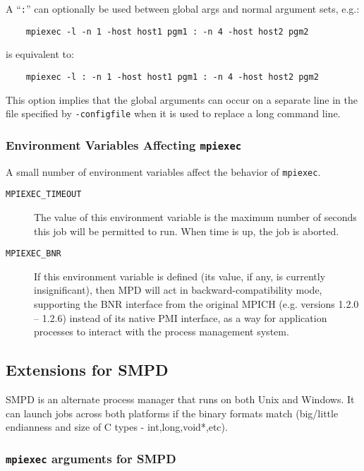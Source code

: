 \documentclass[dvipdfm,11pt]{article}
\begin{document}
A ``\texttt{:}'' can optionally be used between global args
and normal argument sets, e.g.:
\begin{verbatim}
    mpiexec -l -n 1 -host host1 pgm1 : -n 4 -host host2 pgm2
\end{verbatim}
is equivalent to:
\begin{verbatim}
    mpiexec -l : -n 1 -host host1 pgm1 : -n 4 -host host2 pgm2
\end{verbatim}
This option implies that the global arguments can occur on a separate
line in the file specified by \texttt{-configfile} when it is used to 
replace a long command line.

\subsubsection{Environment Variables Affecting \texttt{mpiexec}}
\label{sec:mpd-mpiexec-env}

A small number of environment variables affect the behavior of
\texttt{mpiexec}. 

\begin{description}
\item[\texttt{MPIEXEC\_TIMEOUT}] The value of this environment variable is the
  maximum number of seconds this job will be permitted to run.  When
  time is up, the job is aborted. 
\item[\texttt{MPIEXEC\_BNR}] If this environment variable is defined
  (its value, if any, is currently insignificant), then MPD will act in
  backward-compatibility mode, supporting the BNR interface from the
  original MPICH (e.g. versions 1.2.0 -- 1.2.6)
  instead of its native PMI interface, as a way for application
  processes to interact with the process management system.
\end{description}


\subsection{Extensions for SMPD}
\label{sec:extensions-smpd}

SMPD is an alternate process manager that runs on both Unix and Windows.
It can launch jobs across both platforms if the binary formats match 
(big/little endianness and size of C types - int,long,void*,etc).


\subsubsection{\texttt{mpiexec} arguments for SMPD}
\label{sec:mpiexec-smpd}
\end{document}
